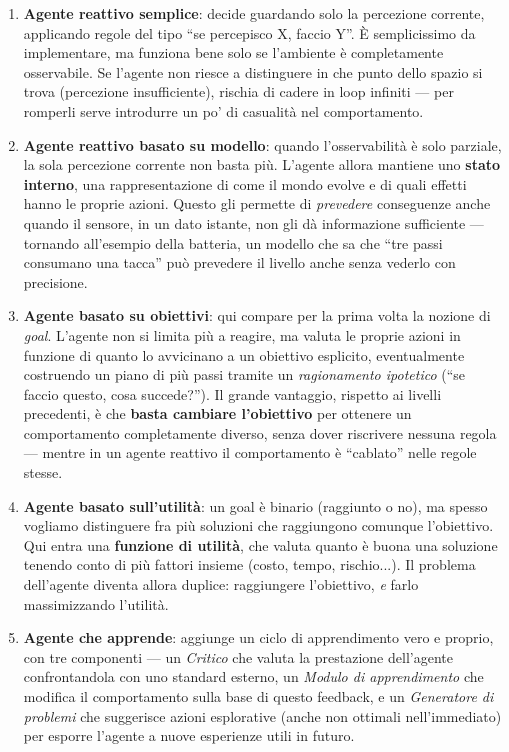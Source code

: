\documentclass[11pt,a4paper]{article}
\begin{document}
\begin{enumerate}
  \item \textbf{Agente reattivo semplice}: decide guardando solo la percezione corrente, applicando regole del tipo ``se percepisco X, faccio Y''. È semplicissimo da implementare, ma funziona bene solo se l'ambiente è completamente osservabile. Se l'agente non riesce a distinguere in che punto dello spazio si trova (percezione insufficiente), rischia di cadere in loop infiniti --- per romperli serve introdurre un po' di casualità nel comportamento.
  \item \textbf{Agente reattivo basato su modello}: quando l'osservabilità è solo parziale, la sola percezione corrente non basta più. L'agente allora mantiene uno \textbf{stato interno}, una rappresentazione di come il mondo evolve e di quali effetti hanno le proprie azioni. Questo gli permette di \emph{prevedere} conseguenze anche quando il sensore, in un dato istante, non gli dà informazione sufficiente --- tornando all'esempio della batteria, un modello che sa che ``tre passi consumano una tacca'' può prevedere il livello anche senza vederlo con precisione.
  \item \textbf{Agente basato su obiettivi}: qui compare per la prima volta la nozione di \emph{goal}. L'agente non si limita più a reagire, ma valuta le proprie azioni in funzione di quanto lo avvicinano a un obiettivo esplicito, eventualmente costruendo un piano di più passi tramite un \emph{ragionamento ipotetico} (``se faccio questo, cosa succede?''). Il grande vantaggio, rispetto ai livelli precedenti, è che \textbf{basta cambiare l'obiettivo} per ottenere un comportamento completamente diverso, senza dover riscrivere nessuna regola --- mentre in un agente reattivo il comportamento è ``cablato'' nelle regole stesse.
  \item \textbf{Agente basato sull'utilità}: un goal è binario (raggiunto o no), ma spesso vogliamo distinguere fra più soluzioni che raggiungono comunque l'obiettivo. Qui entra una \textbf{funzione di utilità}, che valuta quanto è buona una soluzione tenendo conto di più fattori insieme (costo, tempo, rischio...). Il problema dell'agente diventa allora duplice: raggiungere l'obiettivo, \emph{e} farlo massimizzando l'utilità.
  \item \textbf{Agente che apprende}: aggiunge un ciclo di apprendimento vero e proprio, con tre componenti --- un \emph{Critico} che valuta la prestazione dell'agente confrontandola con uno standard esterno, un \emph{Modulo di apprendimento} che modifica il comportamento sulla base di questo feedback, e un \emph{Generatore di problemi} che suggerisce azioni esplorative (anche non ottimali nell'immediato) per esporre l'agente a nuove esperienze utili in futuro.
\end{enumerate}
\end{document}
